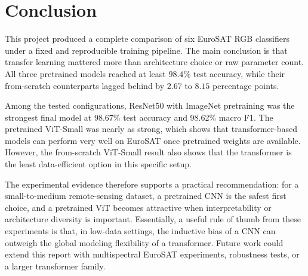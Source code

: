 \documentclass[11pt]{report}
\newcommand{\BestModel}{ResNet50 with ImageNet pretraining}
\newcommand{\BestAcc}{98.67}
\newcommand{\BestMacroFOne}{98.62}
\begin{document}
\chapter{Conclusion}
This project produced a complete comparison of six EuroSAT RGB classifiers under a fixed and reproducible training pipeline. The main conclusion is that transfer learning mattered more than architecture choice or raw parameter count. All three pretrained models reached at least \(98.4\%\) test accuracy, while their from-scratch counterparts lagged behind by \(2.67\) to \(8.15\) percentage points.

Among the tested configurations, \BestModel{} was the strongest final model at \BestAcc{}\% test accuracy and \BestMacroFOne{}\% macro F1. The pretrained ViT-Small was nearly as strong, which shows that transformer-based models can perform very well on EuroSAT once pretrained weights are available. However, the from-scratch ViT-Small result also shows that the transformer is the least data-efficient option in this specific setup.

The experimental evidence therefore supports a practical recommendation: for a small-to-medium remote-sensing dataset, a pretrained CNN is the safest first choice, and a pretrained ViT becomes attractive when interpretability or architecture diversity is important. Essentially, a useful rule of thumb from these experiments is that, in low-data settings, the inductive bias of a CNN can outweigh the global modeling flexibility of a transformer. Future work could extend this report with multispectral EuroSAT experiments, robustness tests, or a larger transformer family.
\end{document}
